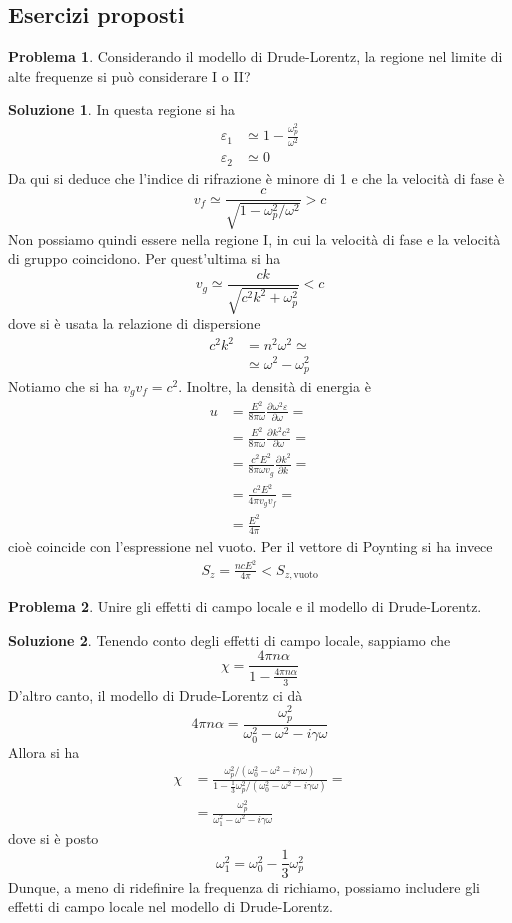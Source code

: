 \documentclass[a4paper,11pt]{book}
\newcommand{\der}[3][]{\frac{\partial ^{#1}#2}{\partial {#3}^{#1}}}
\theoremstyle{theorem}
\theoremstyle{definition}
\newtheorem{problema}{Problema}[section]
\newtheorem{soluzione}{Soluzione}[section]
\begin{document}
\subsection{Esercizi proposti}
\begin{problema}
	Considerando il modello di Drude-Lorentz, la regione nel limite di alte frequenze si può considerare I o II?
\end{problema}
\begin{soluzione}
	In questa regione si ha
	\begin{align*}
		\varepsilon_1&\simeq1-\frac{\omega_p^2}{\omega^2}\\\varepsilon_2&\simeq0
	\end{align*}
	Da qui si deduce che l'indice di rifrazione è minore di 1 e che la velocità di fase è
	\[v_f\simeq\frac{c}{\sqrt{1-\omega_p^2/\omega^2}}>c\]
	Non possiamo quindi essere nella regione I, in cui la velocità di fase e la velocità di gruppo coincidono. Per quest'ultima si ha
	\[v_g\simeq\frac{ck}{\sqrt{c^2k^2+\omega_p^2}}<c\]
	dove si è usata la relazione di dispersione
	\begin{align*}
		c^2k^2&=n^2\omega^2\simeq\\&\simeq\omega^2-\omega_p^2
	\end{align*}
	Notiamo che si ha $v_gv_f=c^2$. Inoltre, la densità di energia è
	\begin{align*}
		u&=\frac{E^2}{8\pi\omega}\der{\omega^2\varepsilon}{\omega}=\\&=\frac{E^2}{8\pi\omega}\der{k^2c^2}{\omega}=\\&=\frac{c^2E^2}{8\pi\omega v_g}\der{k^2}{k}=\\&=\frac{c^2E^2}{4\pi v_gv_f}=\\&=\frac{E^2}{4\pi}
	\end{align*}
	cioè coincide con l'espressione nel vuoto. Per il vettore di Poynting si ha invece
	\begin{align*}
		S_z=\frac{nc E^2}{4\pi}<S_{z,\textrm{vuoto}}
	\end{align*}
\end{soluzione}
\begin{problema}
	Unire gli effetti di campo locale e il modello di Drude-Lorentz.
\end{problema}
\begin{soluzione}
	Tenendo conto degli effetti di campo locale, sappiamo che
	\[\chi=\frac{4\pi n\alpha}{1-\frac{4\pi n\alpha}{3}}\]
	D'altro canto, il modello di Drude-Lorentz ci dà
	\[4\pi n\alpha=\frac{\omega_p^2}{\omega_0^2-\omega^2-i\gamma\omega}\]
	Allora si ha
	\begin{align*}\chi&=\frac{\omega_p^2/(\omega_0^2-\omega^2-i\gamma\omega)}{1-\frac{1}{3}\omega_p^2/(\omega_0^2-\omega^2-i\gamma\omega)}=\\&=\frac{\omega_p^2}{\omega_1^2-\omega^2-i\gamma\omega}
	\end{align*}
	dove si è posto
	\[\omega_1^2=\omega_0^2-\frac{1}{3}\omega_p^2\]
	Dunque, a meno di ridefinire la frequenza di richiamo, possiamo includere gli effetti di campo locale nel modello di Drude-Lorentz.
\end{soluzione}
\end{document}
